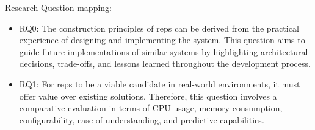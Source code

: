 \noindent
Research Question mapping:
	\begin{itemize}
		\item  RQ0: The construction principles of \gls{reps} can be derived from the practical experience of designing and implementing the system. This question aims to guide future implementations of similar systems by highlighting architectural decisions, trade-offs, and lessons learned throughout the development process.
		\item RQ1: For \gls{reps} to be a viable candidate in real-world environments, it must offer value over existing solutions. Therefore, this question involves a comparative evaluation in terms of CPU usage, memory consumption, configurability, ease of understanding, and predictive capabilities.
	\end{itemize}